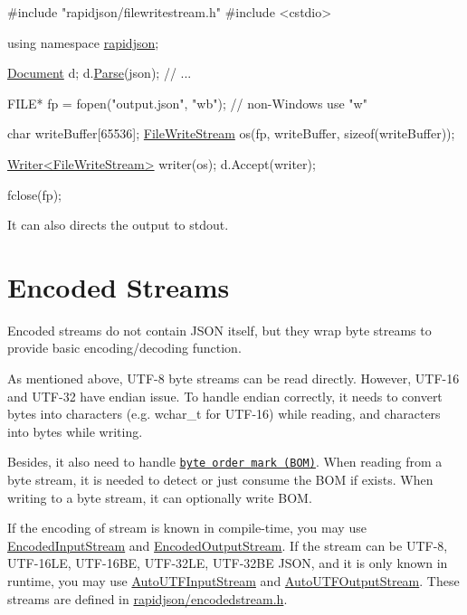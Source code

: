 \begin{DoxyCode}
\textcolor{preprocessor}{#include "rapidjson/filewritestream.h"}
\textcolor{preprocessor}{#include <cstdio>}

\textcolor{keyword}{using namespace }\hyperlink{namespacerapidjson}{rapidjson};

\hyperlink{class_generic_document}{Document} d;
d.\hyperlink{class_generic_document_aebd4e7fddd80c1e1174837aee6d2159b}{Parse}(json);
\textcolor{comment}{// ...}

FILE* fp = fopen(\textcolor{stringliteral}{"output.json"}, \textcolor{stringliteral}{"wb"}); \textcolor{comment}{// non-Windows use "w"}

\textcolor{keywordtype}{char} writeBuffer[65536];
\hyperlink{class_file_write_stream}{FileWriteStream} os(fp, writeBuffer, \textcolor{keyword}{sizeof}(writeBuffer));

\hyperlink{class_writer}{Writer<FileWriteStream>} writer(os);
d.Accept(writer);

fclose(fp);
\end{DoxyCode}


It can also directs the output to {\ttfamily stdout}.\hypertarget{md_Cadriciel_Commun_Externe_RapidJSON_doc_stream.zh-cn_EncodedStreams}{}\section{Encoded Streams}\label{md_Cadriciel_Commun_Externe_RapidJSON_doc_stream.zh-cn_EncodedStreams}
Encoded streams do not contain J\+S\+ON itself, but they wrap byte streams to provide basic encoding/decoding function.

As mentioned above, U\+T\+F-\/8 byte streams can be read directly. However, U\+T\+F-\/16 and U\+T\+F-\/32 have endian issue. To handle endian correctly, it needs to convert bytes into characters (e.\+g. {\ttfamily wchar\+\_\+t} for U\+T\+F-\/16) while reading, and characters into bytes while writing.

Besides, it also need to handle \href{http://en.wikipedia.org/wiki/Byte_order_mark}{\tt byte order mark (B\+OM)}. When reading from a byte stream, it is needed to detect or just consume the B\+OM if exists. When writing to a byte stream, it can optionally write B\+OM.

If the encoding of stream is known in compile-\/time, you may use {\ttfamily \hyperlink{class_encoded_input_stream}{Encoded\+Input\+Stream}} and {\ttfamily \hyperlink{class_encoded_output_stream}{Encoded\+Output\+Stream}}. If the stream can be U\+T\+F-\/8, U\+T\+F-\/16\+LE, U\+T\+F-\/16\+BE, U\+T\+F-\/32\+LE, U\+T\+F-\/32\+BE J\+S\+ON, and it is only known in runtime, you may use {\ttfamily \hyperlink{class_auto_u_t_f_input_stream}{Auto\+U\+T\+F\+Input\+Stream}} and {\ttfamily \hyperlink{class_auto_u_t_f_output_stream}{Auto\+U\+T\+F\+Output\+Stream}}. These streams are defined in {\ttfamily \hyperlink{encodedstream_8h_source}{rapidjson/encodedstream.\+h}}.

